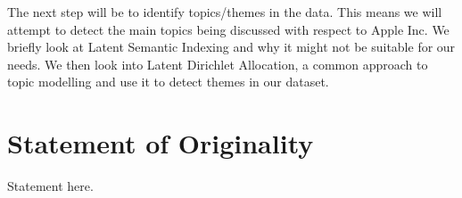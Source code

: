 The next step will be to identify topics/themes in the data. This means we will attempt to detect
the main topics being discussed with respect to Apple Inc. We briefly look at Latent Semantic
Indexing and why it might not be suitable for our needs. We then look into Latent Dirichlet
Allocation, a common approach to topic modelling and use it to detect themes in our dataset.


\section{Statement of Originality}

Statement here.

